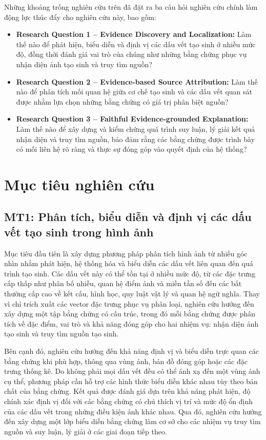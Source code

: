 \documentclass[12pt]{report}
\begin{document}
Những khoảng trống nghiên cứu trên đã đặt ra ba câu hỏi nghiên cứu chính làm động lực thúc đẩy cho nghiên cứu này, bao gồm:
\begin{itemize}
    \item \textbf{Research Question 1 -- Evidence Discovery and Localization:} Làm thế nào để phát hiện, biểu diễn và định vị các dấu vết tạo sinh ở nhiều mức độ, đồng thời đánh giá vai trò của chúng như những bằng chứng phục vụ nhận diện ảnh tạo sinh và truy tìm nguồn? 
    \item \textbf{Research Question 2 -- Evidence-based Source Attribution:} Làm thế nào để phân tích mối quan hệ giữa cơ chế tạo sinh và các dấu vết quan sát được nhằm lựa chọn những bằng chứng có giá trị phân biệt nguồn?
    \item \textbf{Research Question 3 -- Faithful Evidence-grounded Explanation:} Làm thế nào để xây dựng và kiểm chứng quá trình suy luận, lý giải kết quả nhận diện và truy tìm nguồn, bảo đảm rằng các bằng chứng được trình bày có mối liên hệ rõ ràng và thực sự đóng góp vào quyết định của hệ thống?
\end{itemize}

\section{Mục tiêu nghiên cứu}
\label{sec:objectives} 
\subsection{MT1: Phân tích, biểu diễn và định vị các dấu vết tạo sinh trong hình ảnh}
Mục tiêu đầu tiên là xây dựng phương pháp phân tích hình ảnh từ nhiều góc nhìn nhằm phát hiện, hệ thống hóa và biểu diễn các dấu vết liên quan đến quá trình tạo sinh. Các dấu vết này có thể tồn tại ở nhiều mức độ, từ các đặc trưng cấp thấp như phân bố nhiễu, quan hệ điểm ảnh và miền tần số đến các bất thường cấp cao về kết cấu, hình học, quy luật vật lý và quan hệ ngữ nghĩa. Thay vì chỉ trích xuất các vector đặc trưng phục vụ phân loại, nghiên cứu hướng đến xây dựng một tập bằng chứng có cấu trúc, trong đó mỗi bằng chứng được phân tích về đặc điểm, vai trò và khả năng đóng góp cho hai nhiệm vụ: nhận diện ảnh tạo sinh và truy tìm nguồn tạo sinh.

Bên cạnh đó, nghiên cứu hướng đến khả năng định vị và biểu diễn trực quan các bằng chứng khi phù hợp, thông qua vùng ảnh, bản đồ đóng góp hoặc các đặc trưng thống kê. Do không phải mọi dấu vết đều có thể ánh xạ đến một vùng ảnh cụ thể, phương pháp cần hỗ trợ các hình thức biểu diễn khác nhau tùy theo bản chất của bằng chứng. Kết quả được đánh giá dựa trên khả năng phát hiện, độ chính xác định vị đối với các bằng chứng có chú thích vị trí và mức độ ổn định của các dấu vết trong những điều kiện ảnh khác nhau. Qua đó, nghiên cứu hướng đến xây dựng một lớp biểu diễn bằng chứng làm cơ sở cho các nhiệm vụ truy tìm nguồn và suy luận, lý giải ở các giai đoạn tiếp theo.
\end{document}
